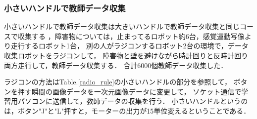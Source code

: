 \subsubsection{小さいハンドルで教師データ収集}
小さいハンドルで教師データ収集は大きいハンドルで教師データ収集と同じコースで収集する
，障害物については，止まってるロボット約6台，感覚運動写像より走行するロボット1台，
別の人がラジコンするロボット2台の環境で，データ収集ロボットをラジコンして，
障害物と壁を避けながら時計回りと反時計回り両方走行して，教師データ収集する．
合計6000個教師データ収集した．

ラジコンの方法はTable.\ref{radio_rule}の小さいハンドルの部分を参照して，
ボタンを押す瞬間の画像データを一次元画像データに変更して，
ソケット通信で学習用パソコンに送信して，教師データの収集を行う．
小さいハンドルというのは，ボタン"J"と"L"押すと，モーターの出力が15単位変えるということである．

